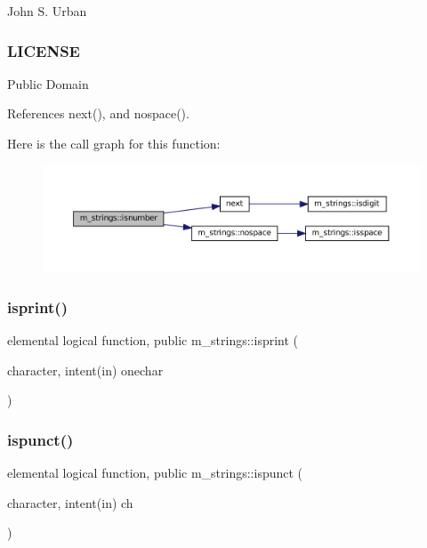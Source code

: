 John S. Urban \subsubsection*{L\+I\+C\+E\+N\+SE}

Public Domain 

References next(), and nospace().

Here is the call graph for this function\+:\nopagebreak
\begin{figure}[H]
\begin{center}
\leavevmode
\includegraphics[width=350pt]{namespacem__strings_a2b6c57cbc52fc86d2f02d0936d3484af_cgraph}
\end{center}
\end{figure}
\mbox{\label{namespacem__strings_a267f2fde729a75496c82a64754a91e54}} 
\subsubsection{\texorpdfstring{isprint()}{isprint()}}
{\footnotesize\ttfamily elemental logical function, public m\+\_\+strings\+::isprint (\begin{DoxyParamCaption}\item[{character, intent(in)}]{onechar }\end{DoxyParamCaption})}

\mbox{\label{namespacem__strings_a8712164e1f5fd717bdea854a3f067619}} 
\subsubsection{\texorpdfstring{ispunct()}{ispunct()}}
{\footnotesize\ttfamily elemental logical function, public m\+\_\+strings\+::ispunct (\begin{DoxyParamCaption}\item[{character, intent(in)}]{ch }\end{DoxyParamCaption})}

